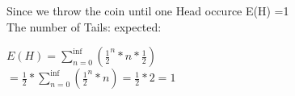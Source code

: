 Since we throw the coin until one Head occurce E(H) =1  \\

The number of Tails: expected:

$E(H) = \sum_{n=0}^{\inf} (\frac{1}{2}^{n}*n * \frac{1}{2}) $ \\
$ = \frac{1}{2} *\sum_{n=0}^{\inf} (\frac{1}{2}^{n}*n) = \frac{1}{2} * 2 = 1 $
